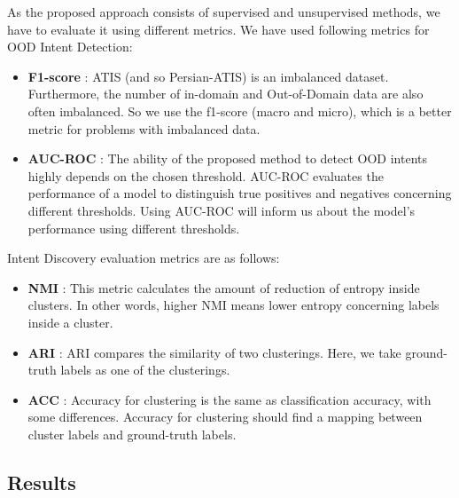 \documentclass{article}
\begin{document}
\noindent As the proposed approach consists of supervised and unsupervised methods, we have to evaluate it using different metrics.
We have used following metrics for OOD Intent Detection:
\begin{itemize}
  \item \textbf{F1-score} : ATIS (and so Persian-ATIS) is an imbalanced dataset. 
                          Furthermore, the number of in-domain and Out-of-Domain data are also often imbalanced. 
                          So we use the f1-score (macro and micro), which is a better metric for problems with imbalanced data.  
  \item \textbf{AUC-ROC} : The ability of the proposed method to detect OOD intents highly depends on the chosen threshold. 
                          AUC-ROC evaluates the performance of a model to distinguish true positives and negatives concerning different thresholds. 
                          Using AUC-ROC will inform us about the model's performance using different thresholds.
\end{itemize}
Intent Discovery evaluation metrics are as follows:
\begin{itemize}
  \item \textbf{NMI} : This metric calculates the amount of reduction of entropy inside clusters. In other words, higher NMI means lower entropy concerning labels inside a cluster.
  \item \textbf{ARI} : ARI compares the similarity of two clusterings. Here, we take ground-truth labels as one of the clusterings.
  \item \textbf{ACC} : Accuracy for clustering is the same as classification accuracy, with some differences. Accuracy for clustering should find a mapping between cluster labels and ground-truth labels.
\end{itemize}

\subsection{Results}
\end{document}
